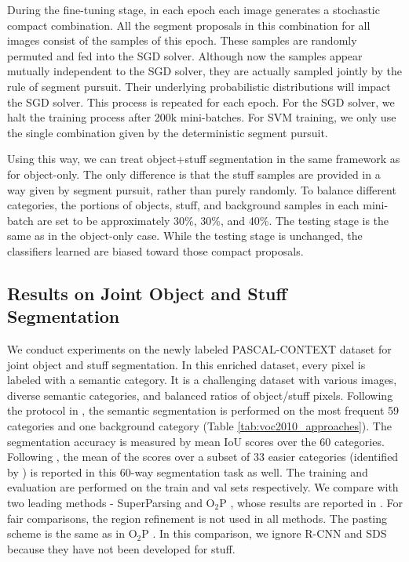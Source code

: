 \documentclass[10pt,twocolumn,letterpaper]{article}
\begin{document}
During the fine-tuning stage, in each epoch each image generates a stochastic compact combination. All the segment proposals in this combination for all images consist of the samples of this epoch. These samples are randomly permuted and fed into the SGD solver. Although now the samples appear mutually independent to the SGD solver, they are actually sampled jointly by the rule of segment pursuit. Their underlying probabilistic distributions will impact the SGD solver. This process is repeated for each epoch. For the SGD solver, we halt the training process after 200k mini-batches. For SVM training, we only use the single combination given by the deterministic segment pursuit.

Using this way, we can treat object+stuff segmentation in the same framework as for object-only. The only difference is that the stuff samples are provided in a way given by segment pursuit, rather than purely randomly.
To balance different categories, the portions of objects, stuff, and background samples in each mini-batch are set to be approximately 30\%, 30\%, and 40\%. The testing stage is the same as in the object-only case. While the testing stage is unchanged, the classifiers learned are biased toward those compact proposals.

\subsection{Results on Joint Object and Stuff Segmentation}

We conduct experiments on the newly labeled PASCAL-CONTEXT dataset \cite{mottaghi2014role} for joint object and stuff segmentation. In this enriched dataset, every pixel is labeled with a semantic category. It is a challenging dataset with various images, diverse semantic categories, and balanced ratios of object/stuff pixels. Following the protocol in \cite{mottaghi2014role}, the semantic segmentation is performed on the most frequent 59 categories and one background category (Table \ref{tab:voc2010_approaches}). The segmentation accuracy is measured by mean IoU scores over the 60 categories. Following \cite{mottaghi2014role}, the mean of the scores over a subset of 33 easier categories (identified by \cite{mottaghi2014role}) is reported in this 60-way segmentation task as well. The training and evaluation are performed on the train and val sets respectively.
We compare with two leading methods - SuperParsing \cite{tighe2010superparsing} and O$_2$P \cite{carreira2012semantic}, whose results are reported in \cite{mottaghi2014role}. For fair comparisons, the region refinement \cite{hariharan2014simultaneous} is not used in all methods. The pasting scheme is the same as in O$_2$P \cite{carreira2012semantic}. In this comparison, we ignore R-CNN \cite{girshick2013rich} and SDS \cite{hariharan2014simultaneous} because they have not been developed for stuff.
\end{document}
